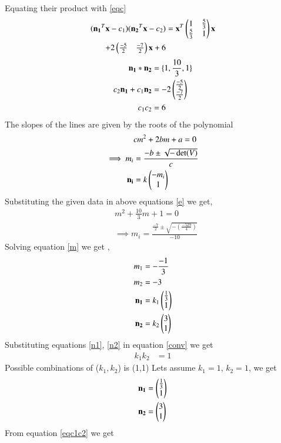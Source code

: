 \documentclass[journal,12pt,twocolumn]{IEEEtran}
\begin{document}
Equating their product with \eqref{eqc}
\begin{align}
(\mathbf{n_1}^T\mathbf{x}-c_1)(\mathbf{n_2}^T\mathbf{x}-c_2) &=\mathbf{x}^T\begin{pmatrix}1 & \frac{5}{3} \\\frac{5}{3} & 1\end{pmatrix}\mathbf{x}\notag\\
+2\begin{pmatrix}\frac{-5}{2} & \frac{-7}{2}\end{pmatrix}\mathbf{x}+6\label{equate}
\end{align}
\begin{align}
    \mathbf{n_1}*\mathbf{n_2}&=\{1,\frac{10}{3},1\}\label{conv}\\
    c_2\mathbf{n_1}+c_1\mathbf{n_2}&=-2\begin{pmatrix}\frac{-5}{2}\\\frac{-7}{2}\end{pmatrix}\label{eqc1c2}\\
    c_1c_2&=6
\end{align}
The slopes of the lines are given by the roots of the polynomial 
\begin{align}
    &cm^2+2bm+a=0\label{e}\\
    \implies m_i&=\frac{-b\pm{\sqrt{-\det(V)}}}{c}\\
    \mathbf{n_i}&=k\begin{pmatrix}-m_i\\1\end{pmatrix}
\end{align}
Substituting the given data in above equations \eqref{e} we get,
\begin{align}
    &m^2+\frac{10}{3}m+1=0\\
    &\implies m_i=\frac{\frac{-7}{2}\pm{\sqrt{-(\frac{-529}{4})}}}{-10}\label{m}
\end{align}
Solving equation \eqref{m} we get ,
\begin{align}
    m_1&=-\frac{-1}{3}\\
    m_2&=-3\\
    \mathbf{n_1}&=k_1\begin{pmatrix}\frac{1}{3}\\1\end{pmatrix}\label{n1}\\
    \mathbf{n_2}&=k_2\begin{pmatrix}{3}\\1\end{pmatrix}\label{n2}
\end{align}
Substituting equations \eqref{n1}, \eqref{n2} in equation \eqref{conv} we get 
\begin{align}
    k_1k_2&=1
\end{align}
Possible combinations of ($k_1,k_2$) is (1,1)
Lets assume $k_1=1$, $k_2=1$, we get 
\begin{align}
    \mathbf{n_1}&=\begin{pmatrix}\frac{1}{3} \\1\end{pmatrix}\label{n11}\\
    \mathbf{n_2}&=\begin{pmatrix}3\\1\end{pmatrix}\label{n22}
\end{align}
From equation \eqref{eqc1c2} we get 
\end{document}
